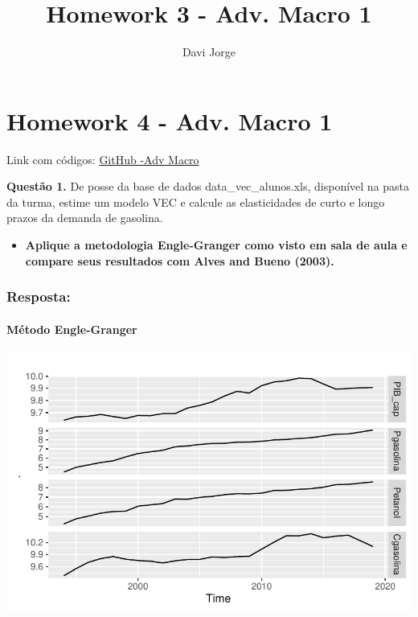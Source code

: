 \documentclass[
  letterpaper,
  DIV=11,
  numbers=noendperiod]{scrartcl}
\title{Homework 3 - Adv. Macro 1}
\author{Davi Jorge}
\date{}
\let\oldparagraph\paragraph
\renewcommand{\paragraph}[1]{\oldparagraph{#1}\mbox{}}
\providecommand{\tightlist}{%
  \setlength{\itemsep}{0pt}\setlength{\parskip}{0pt}}\usepackage{longtable,booktabs,array}
\renewcommand*\contentsname{Table of contents}
\newcommand\contentsname{Table of contents}
\begin{document}
\maketitle
\ifdefined\Shaded\renewenvironment{Shaded}{\begin{tcolorbox}[enhanced, interior hidden, boxrule=0pt, sharp corners, frame hidden, borderline west={3pt}{0pt}{shadecolor}, breakable]}{\end{tcolorbox}}\fi

\renewcommand*\contentsname{Table of contents}
{
\hypersetup{linkcolor=}
\setcounter{tocdepth}{3}
\tableofcontents
}
\hypertarget{homework-4---adv.-macro-1}{%
\section{Homework 4 - Adv. Macro 1}\label{homework-4---adv.-macro-1}}

Link com códigos: \href{https://github.com/davijorge22/adv-macro}{GitHub
-Adv Macro}

\textbf{Questão 1.} De posse da base de dados data\_vec\_alunos.xls,
disponível na pasta da turma, estime um modelo VEC e calcule as
elasticidades de curto e longo prazos da demanda de gasolina.

\begin{itemize}
\tightlist
\item
  \textbf{Aplique a metodologia Engle-Granger como visto em sala de aula
  e compare seus resultados com Alves and Bueno (2003). }
\end{itemize}

\hypertarget{resposta}{%
\subsubsection{Resposta:}\label{resposta}}

\hypertarget{muxe9todo-engle-granger}{%
\paragraph{Método Engle-Granger}\label{muxe9todo-engle-granger}}

\includegraphics{Homework4_files/figure-pdf/unnamed-chunk-2-1.pdf}
\end{document}

